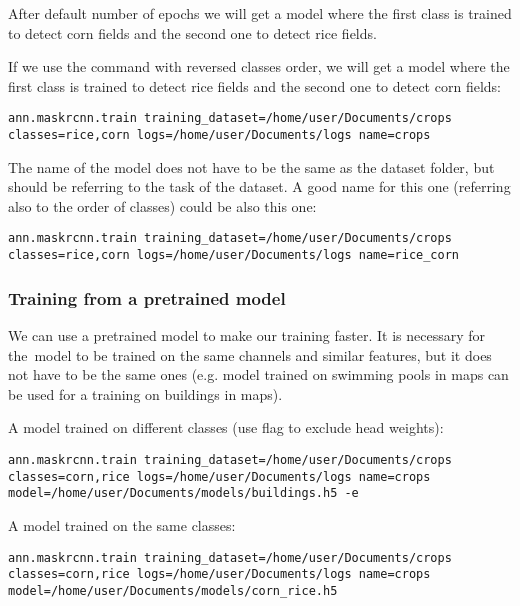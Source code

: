 After default number of epochs we will get a model where the first class is
trained to detect corn fields and the second one to detect rice fields. 

If we use the command with reversed classes order, we will get a model where the
first class is trained to detect rice fields and the second one to detect corn
fields:

\begin{lstlisting}[breaklines=true]
ann.maskrcnn.train training_dataset=/home/user/Documents/crops classes=rice,corn logs=/home/user/Documents/logs name=crops
\end{lstlisting}

The name of the model does not have to be the same as the dataset folder, but
should be referring to the task of the dataset. A good name for this one
(referring also to the order of classes) could be also this one: 

\begin{lstlisting}[breaklines=true]
ann.maskrcnn.train training_dataset=/home/user/Documents/crops classes=rice,corn logs=/home/user/Documents/logs name=rice_corn
\end{lstlisting}

\subsubsection*{Training from a pretrained model}
We can use a pretrained model to make our training faster. It is necessary for
the~model to be trained on the same channels and similar features, but it does
not have to be the same ones (e.g. model trained on swimming pools in maps can
be used for a training on buildings in maps). 

A model trained on different classes (use  flag to
exclude head weights):

\begin{lstlisting}[breaklines=true]
ann.maskrcnn.train training_dataset=/home/user/Documents/crops classes=corn,rice logs=/home/user/Documents/logs name=crops model=/home/user/Documents/models/buildings.h5 -e
\end{lstlisting}

A model trained on the same classes:

\begin{lstlisting}[breaklines=true]
ann.maskrcnn.train training_dataset=/home/user/Documents/crops classes=corn,rice logs=/home/user/Documents/logs name=crops model=/home/user/Documents/models/corn_rice.h5
\end{lstlisting}

